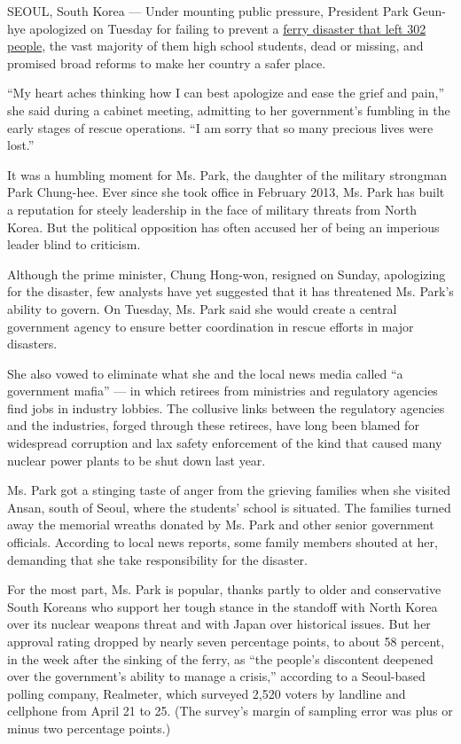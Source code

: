 SEOUL, South Korea --- Under mounting public pressure, President Park
Geun-hye apologized on Tuesday for failing to prevent a
\href{http://www.nytimes.com/2014/04/17/world/asia/south-korean-ferry-accident.html}{ferry
disaster that left 302 people}, the vast majority of them high school
students, dead or missing, and promised broad reforms to make her
country a safer place.

``My heart aches thinking how I can best apologize and ease the grief
and pain,'' she said during a cabinet meeting, admitting to her
government's fumbling in the early stages of rescue operations. ``I am
sorry that so many precious lives were lost.''

It was a humbling moment for Ms. Park, the daughter of the military
strongman Park Chung-hee. Ever since she took office in February 2013,
Ms. Park has built a reputation for steely leadership in the face of
military threats from North Korea. But the political opposition has
often accused her of being an imperious leader blind to criticism.

Although the prime minister, Chung Hong-won, resigned on Sunday,
apologizing for the disaster, few analysts have yet suggested that it
has threatened Ms. Park's ability to govern. On Tuesday, Ms. Park said
she would create a central government agency to ensure better
coordination in rescue efforts in major disasters.

She also vowed to eliminate what she and the local news media called ``a
government mafia'' --- in which retirees from ministries and regulatory
agencies find jobs in industry lobbies. The collusive links between the
regulatory agencies and the industries, forged through these retirees,
have long been blamed for widespread corruption and lax safety
enforcement of the kind that caused many nuclear power plants to be shut
down last year.

Ms. Park got a stinging taste of anger from the grieving families when
she visited Ansan, south of Seoul, where the students' school is
situated. The families turned away the memorial wreaths donated by Ms.
Park and other senior government officials. According to local news
reports, some family members shouted at her, demanding that she take
responsibility for the disaster.

For the most part, Ms. Park is popular, thanks partly to older and
conservative South Koreans who support her tough stance in the standoff
with North Korea over its nuclear weapons threat and with Japan over
historical issues. But her approval rating dropped by nearly seven
percentage points, to about 58 percent, in the week after the sinking of
the ferry, as ``the people's discontent deepened over the government's
ability to manage a crisis,'' according to a Seoul-based polling
company, Realmeter, which surveyed 2,520 voters by landline and
cellphone from April 21 to 25. (The survey's margin of sampling error
was plus or minus two percentage points.)

